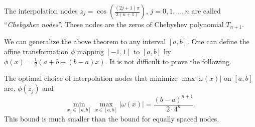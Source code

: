 \begin{definition}
    The interpolation nodes $z_j = \cos(\frac{(2j+1)\pi}{2(n+1)})$, $j = 0, 1, \dots, n$ are called ``\textit{Chebyshev nodes}''. These nodes are the zeros of Chebyshev polynomial $T_{n+1}$.
\end{definition}
We can generalize the above theorem to any interval $[a, b]$. One can define the affine transformation $\phi$ mapping $[-1,1]$ to $[a, b]$ by $\phi(x) = \frac{1}{2} (a + b + (b-a)x)$. It is not difficult to prove the following.
\begin{corollary}
\label{Cor: 2-Che-err-any}
    The optimal choice of interpolation nodes that minimize $\max |\omega(x)|$ on $[a, b]$ are, $\phi(z_j)$ and 
   $$\min_{x_j\in [a, b]} \max_{x\in [a, b]} |\omega(x)| = \frac{(b-a)^{n+1}}{2\cdot 4^n}.$$
   This bound is much smaller than the bound for equally spaced nodes.
\end{corollary}

